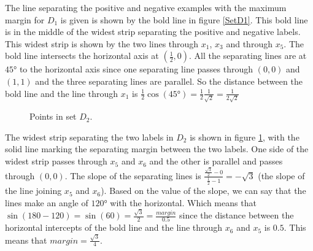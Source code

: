 \begin{enumerate}
\begin{enumerate}
The line separating the positive and negative examples with the maximum margin for $D_1$ is given is shown by the bold line in figure \ref{SetD1}. This bold line is in the middle of the widest strip separating the positive and negative labels. This widest strip is shown by the two lines through $x_1$, $x_3$ and through $x_5$. The bold line intersects the horizontal axis at $(\frac{1}{2}, 0)$. All the separating lines are at $45 \si{\degree}$ to the horizontal axis since one separating line passes through $(0, 0)$ and $(1, 1)$ and the three separating lines are parallel. So the distance between the bold line and the line through $x_1$ is $\frac{1}{2} \cos(45\si{\degree}) =  \frac{1}{2} \frac{1}{\sqrt{2}} =  \frac{1}{2\sqrt{2}}$

   
   \begin{figure}[H]
    \centering
    \caption{Points in set $D_2$.} \label{SetD2}
  \end{figure}  

The widest strip separating the two labels in $D_2$ is shown in figure \ref{SetD2}, with the solid line marking the separating margin between the two labels. One side of the widest strip passes through $x_5$ and $x_6$ and the other is parallel and passes through $(0, 0)$. The slope of the separating lines is $\frac{\frac{\sqrt{3}}{2} - 0}{\frac{1}{2} -1} = -\sqrt{3}$ (the slope of the line joining $x_5$ and $x_6$). Based on the value of the slope, we can say that the lines make an angle of $120 \si{\degree}$ with the horizontal. Which means that $\sin(180 - 120) = \sin(60) = \frac{\sqrt{3}}{2} = \frac{margin}{0.5}$ since the distance between the horizontal intercepts of the bold line and the line through $x_6$ and $x_5$ is $0.5$. This means that $margin = \frac{\sqrt{3}}{4}$.
   

\end{enumerate}
\end{enumerate}
